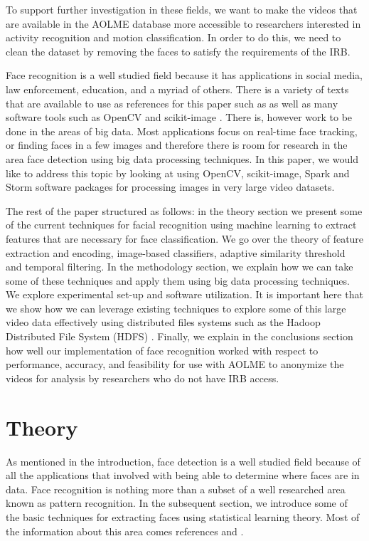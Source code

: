 \documentclass[
	submission,
	final,
	notitlepage,
	narroweqnarray,
	inline,
	twoside,
	]{ieee}
\begin{document}
To support further investigation in these fields, we want to make the videos that are available
in the AOLME database more accessible to researchers interested in 
activity recognition and motion classification. In order to do this, 
we need to clean the dataset by removing the faces to satisfy the requirements
of the IRB.

Face recognition is a well studied field because it has applications in 
social media, law enforcement, education, and a myriad of others. There is a 
variety of texts that are available to use as references for this paper such
as \cite{face_recog_book} \cite{kernel_learning} \cite{machine_face_recog} 
as well as many software tools such as OpenCV \cite{opencv} and scikit-image
\cite{scikit-image}. There is, however work to be done in the areas of
big data. Most applications focus on real-time face tracking, or finding
faces in a few images and therefore there is room for research in the area
face detection using big data processing techniques. In this paper, we
would like to address this topic by looking at using OpenCV, scikit-image, 
Spark and Storm software packages for processing images in very large
video datasets.

The rest of the paper structured as follows: in the theory section we 
present some of the current techniques for facial recognition using 
machine learning to extract features that are necessary for face 
classification. We go over the theory of feature extraction and encoding, 
image-based classifiers, adaptive similarity threshold and temporal filtering. 
In the methodology section, we explain how we can take some of these
techniques and apply them using big data processing techniques. 
We explore experimental set-up and software utilization. It is 
important here that we show how we can leverage existing techniques
to explore some of this large video data effectively using distributed
files systems such as the Hadoop Distributed File System (HDFS) \cite{hadoop}. 
Finally, we explain in the conclusions section how well our 
implementation of face recognition worked with respect to 
performance, accuracy, and feasibility for use with AOLME to
 anonymize the videos for analysis by researchers who do not have
IRB access.  

\section{Theory}
\PARstart As mentioned in the introduction, face detection is a well 
studied field because of all the applications that involved with 
being able to determine where faces are in data. Face recognition
is nothing more than a subset of a well researched area known as 
pattern recognition. In the subsequent section, we introduce some
of the basic techniques for extracting faces using statistical 
learning theory. Most of the information about this area comes
references \cite{face_recog_book} and \cite{kernel_learning}.
\end{document}
